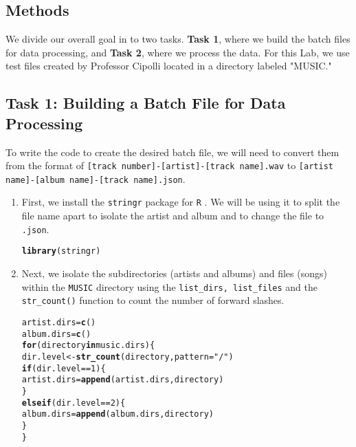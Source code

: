 \documentclass{article}\usepackage[]{graphicx}\usepackage[]{xcolor}
\makeatletter
\newcommand{\hlnum}[1]{\textcolor[rgb]{0.686,0.059,0.569}{#1}}%
\newcommand{\hlsng}[1]{\textcolor[rgb]{0.192,0.494,0.8}{#1}}%
\newcommand{\hlopt}[1]{\textcolor[rgb]{0,0,0}{#1}}%
\newcommand{\hldef}[1]{\textcolor[rgb]{0.345,0.345,0.345}{#1}}%
\newcommand{\hlkwa}[1]{\textcolor[rgb]{0.161,0.373,0.58}{\textbf{#1}}}%
\newcommand{\hlkwb}[1]{\textcolor[rgb]{0.69,0.353,0.396}{#1}}%
\newcommand{\hlkwc}[1]{\textcolor[rgb]{0.333,0.667,0.333}{#1}}%
\newcommand{\hlkwd}[1]{\textcolor[rgb]{0.737,0.353,0.396}{\textbf{#1}}}%
\newenvironment{kframe}{%
 \def\at@end@of@kframe{}%
 \ifinner\ifhmode%
  \def\at@end@of@kframe{\end{minipage}}%
  \begin{minipage}{\columnwidth}%
 \fi\fi%
 \def\FrameCommand##1{\hskip\@totalleftmargin \hskip-\fboxsep
 \colorbox{shadecolor}{##1}\hskip-\fboxsep
     \hskip-\linewidth \hskip-\@totalleftmargin \hskip\columnwidth}%
 \MakeFramed {\advance\hsize-\width
   \@totalleftmargin\z@ \linewidth\hsize
   \@setminipage}}%
 {\par\unskip\endMakeFramed%
 \at@end@of@kframe}
\newenvironment{knitrout}{}{} %
\makeatother
\begin{document}
\begin{multicols}{2}
\section{Methods}
We divide our overall goal in to two tasks. \textbf{Task 1}, where we build the batch files for data processing, and \textbf{Task 2}, where we process the data. For this Lab, we use test files created by Professor Cipolli located in a directory labeled "MUSIC." 


\subsection{Task 1: Building a Batch File for Data Processing}
To write the code to create the desired batch file, we will need to convert them from the format of \texttt{[track number]-[artist]-[track name].wav} to \texttt{[artist name]-[album name]-[track name].json}. 

\begin{enumerate}[1.]\itemsep0em
\item First, we install the \texttt{stringr} package for \texttt{R} \citep{}. We will be using it to split the file name apart to isolate the artist and album and to change the file to \texttt{.json}. 
\begin{knitrout}\scriptsize
{}\color{fgcolor}\begin{kframe}
\begin{alltt}
\hlkwd{library}\hldef{(stringr)}
\end{alltt}
\end{kframe}
\end{knitrout}

\item Next, we isolate the subdirectories (artists and albums) and files (songs) within the \texttt{MUSIC} directory using the \texttt{list\_dirs, list\_files} and the \texttt{str\_count()} function to count the number of forward slashes.
\begin{knitrout}\scriptsize
{}\color{fgcolor}\begin{kframe}
\begin{alltt}
\hldef{artist.dirs} \hlkwb{=} \hlkwd{c}\hldef{()}
\hldef{album.dirs} \hlkwb{=} \hlkwd{c}\hldef{()}
\hlkwa{for} \hldef{(directory} \hlkwa{in} \hldef{music.dirs)\{}
  \hldef{dir.level} \hlkwb{<-} \hlkwd{str_count}\hldef{(directory,} \hlkwc{pattern} \hldef{=} \hlsng{"/"}\hldef{)}
  \hlkwa{if} \hldef{(dir.level} \hlopt{==} \hlnum{1}\hldef{)\{}
  \hldef{artist.dirs} \hlkwb{=} \hlkwd{append}\hldef{(artist.dirs, directory)}
  \hldef{\}}
  \hlkwa{else if} \hldef{(dir.level} \hlopt{==} \hlnum{2}\hldef{)\{}
    \hldef{album.dirs} \hlkwb{=} \hlkwd{append}\hldef{(album.dirs, directory)}
  \hldef{\}}
\hldef{\}}
\end{alltt}
\end{kframe}
\end{knitrout}


\end{enumerate}
\end{multicols}
\end{document}
